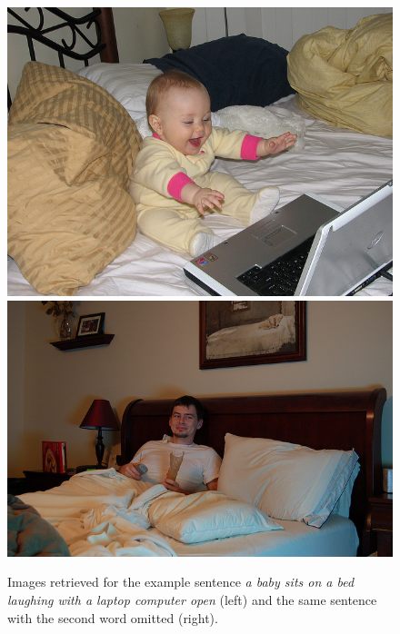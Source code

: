 \begin{figure}[t]
  \centering
  \includegraphics[scale=0.25]{85826.jpg}
  \includegraphics[scale=0.25]{60596.jpg}
  \caption{Images retrieved for the example sentence {\it a baby sits
      on a bed laughing with a laptop computer open} (left) and the
    same sentence with the second word omitted (right).}
  \label{fig:omissionexpic}
\end{figure}





 
